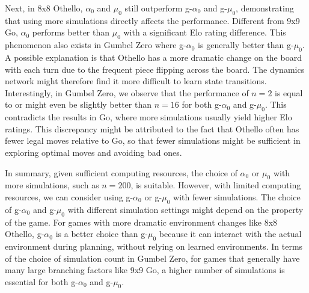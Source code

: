Next, in 8x8 Othello, $\alpha_0$ and $\mu_0$ still outperform g-$\alpha_0$ and g-$\mu_0$, demonstrating that using more simulations directly affects the performance.
Different from 9x9 Go, $\alpha_0$ performs better than $\mu_0$ with a significant Elo rating difference.
This phenomenon also exists in Gumbel Zero where g-$\alpha_0$ is generally better than g-$\mu_0$.
A possible explanation is that Othello has a more dramatic change on the board with each turn due to the frequent piece flipping across the board.
The dynamics network might therefore find it more difficult to learn state transitions.
Interestingly, in Gumbel Zero, we observe that the performance of $n=2$ is equal to or might even be slightly better than $n=16$ for both g-$\alpha_0$ and g-$\mu_0$.
This contradicts the results in Go, where more simulations usually yield higher Elo ratings.
This discrepancy might be attributed to the fact that Othello often has fewer legal moves relative to Go, so that fewer simulations might be sufficient in exploring optimal moves and avoiding bad ones.

In summary, given sufficient computing resources, the choice of $\alpha_0$ or $\mu_0$ with more simulations, such as $n=200$, is suitable.
However, with limited computing resources, we can consider using g-$\alpha_0$ or g-$\mu_0$ with fewer simulations.
The choice of g-$\alpha_0$ and g-$\mu_0$ with different simulation settings might depend on the property of the game.
For games with more dramatic environment changes like 8x8 Othello, g-$\alpha_0$ is a better choice than g-$\mu_0$ because it can interact with the actual environment during planning, without relying on learned environments.
In terms of the choice of simulation count in Gumbel Zero, for games that generally have many large branching factors like 9x9 Go, a higher number of simulations is essential for both g-$\alpha_0$ and g-$\mu_0$.


